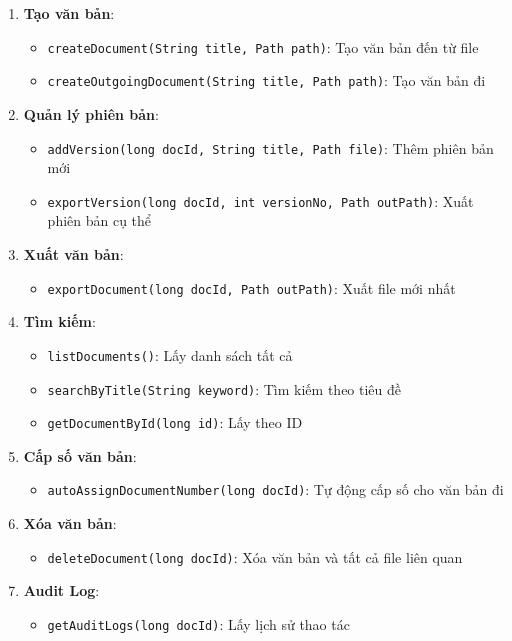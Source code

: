 \documentclass[12pt,a4paper]{article}
\begin{document}
\begin{enumerate}
    \item \textbf{Tạo văn bản}:
    \begin{itemize}
        \item \texttt{createDocument(String title, Path path)}: Tạo văn bản đến từ file
        \item \texttt{createOutgoingDocument(String title, Path path)}: Tạo văn bản đi
    \end{itemize}
    
    \item \textbf{Quản lý phiên bản}:
    \begin{itemize}
        \item \texttt{addVersion(long docId, String title, Path file)}: Thêm phiên bản mới
        \item \texttt{exportVersion(long docId, int versionNo, Path outPath)}: Xuất phiên bản cụ thể
    \end{itemize}
    
    \item \textbf{Xuất văn bản}:
    \begin{itemize}
        \item \texttt{exportDocument(long docId, Path outPath)}: Xuất file mới nhất
    \end{itemize}
    
    \item \textbf{Tìm kiếm}:
    \begin{itemize}
        \item \texttt{listDocuments()}: Lấy danh sách tất cả
        \item \texttt{searchByTitle(String keyword)}: Tìm kiếm theo tiêu đề
        \item \texttt{getDocumentById(long id)}: Lấy theo ID
    \end{itemize}
    
    \item \textbf{Cấp số văn bản}:
    \begin{itemize}
        \item \texttt{autoAssignDocumentNumber(long docId)}: Tự động cấp số cho văn bản đi
    \end{itemize}
    
    \item \textbf{Xóa văn bản}:
    \begin{itemize}
        \item \texttt{deleteDocument(long docId)}: Xóa văn bản và tất cả file liên quan
    \end{itemize}
    
    \item \textbf{Audit Log}:
    \begin{itemize}
        \item \texttt{getAuditLogs(long docId)}: Lấy lịch sử thao tác
    \end{itemize}
\end{enumerate}
\end{document}
